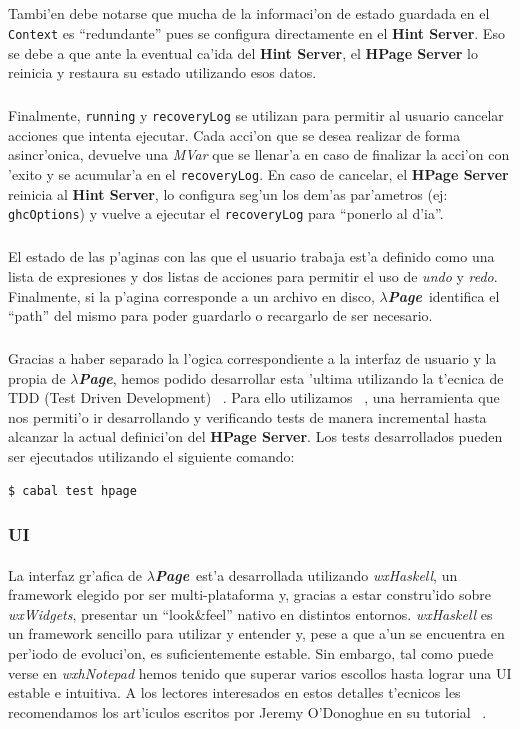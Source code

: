 \documentclass[a4paper]{article}
\newcommand{\hpage}{\textbf{\textsl{$\lambda$Page}}}
\begin{document}
\subparagraph{}Tambi'en debe notarse que mucha de la informaci'on de estado guardada en el \texttt{Context} es ``redundante'' pues se configura directamente en el \textbf{Hint Server}.  Eso se debe a que ante la eventual ca'ida del \textbf{Hint Server}, el \textbf{HPage Server} lo reinicia y restaura su estado utilizando esos datos.
\subparagraph{}Finalmente, \texttt{running} y \texttt{recoveryLog} se utilizan para permitir al usuario cancelar acciones que intenta ejecutar.  Cada acci'on que se desea realizar de forma asincr'onica, devuelve una \textsl{MVar} que se llenar'a en caso de finalizar la acci'on con 'exito y se acumular'a en el \texttt{recoveryLog}.  En caso de cancelar, el \textbf{HPage Server} reinicia al \textbf{Hint Server}, lo configura seg'un los dem'as par'ametros (ej: \texttt{ghcOptions}) y vuelve a ejecutar el \texttt{recoveryLog} para ``ponerlo al d'ia''.
\subparagraph{}El estado de las p'aginas con las que el usuario trabaja est'a definido como una lista de expresiones y dos listas de acciones para permitir el uso de \textsl{undo} y \textsl{redo}.  Finalmente, si la p'agina corresponde a un archivo en disco, \hpage\ identifica el ``path'' del mismo para poder guardarlo o recargarlo de ser necesario.
\subparagraph{}Gracias a haber separado la l'ogica correspondiente a la interfaz de usuario y la propia de \hpage, hemos podido desarrollar esta 'ultima utilizando la t'ecnica de TDD (Test Driven Development) ~\cite{tdd}.  Para ello utilizamos ~\cite{quickcheck}, una herramienta que nos permiti'o ir desarrollando y verificando tests de manera incremental hasta alcanzar la actual definici'on del \textbf{HPage Server}.  Los tests desarrollados pueden ser ejecutados utilizando el siguiente comando:
\lstset{language=sh, frame=single, tabsize=2}
\begin{center}\begin{lstlisting}
$ cabal test hpage
\end{lstlisting}\end{center}
\lstset{language=haskell, frame=single, tabsize=4}

\subsubsection{UI}
\paragraph{}La interfaz gr'afica de \hpage\ est'a desarrollada utilizando \textsl{wxHaskell}, un framework elegido por ser multi-plataforma y, gracias a estar constru'ido sobre \textsl{wxWidgets}, presentar un ``look\&feel'' nativo en distintos entornos.  \textsl{wxHaskell} es un framework sencillo para utilizar y entender y, pese a que a'un se encuentra en per'iodo de evoluci'on, es suficientemente estable.  Sin embargo, tal como puede verse en \textsl{wxhNotepad} hemos tenido que superar varios escollos hasta lograr una UI estable e intuitiva.  A los lectores interesados en estos detalles t'ecnicos les recomendamos los art'iculos escritos por Jeremy O'Donoghue en su tutorial ~\cite{wewantarock}.
\end{document}
